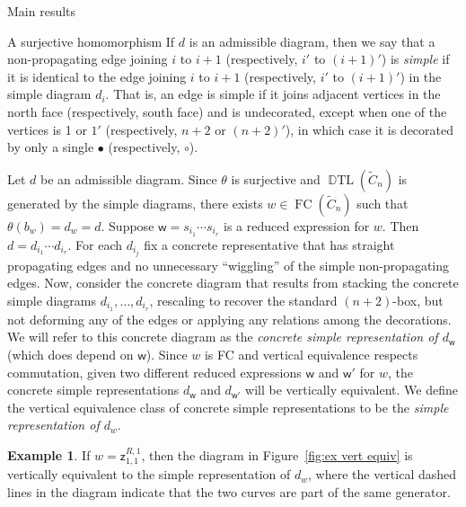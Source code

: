 \documentclass[11pt]{amsart}
\theoremstyle{definition}
\newtheorem{example}[theorem]{Example}
\numberwithin{equation}{section}
\newcommand{\C}{\widetilde{C}}
\newcommand{\z}{\mathsf{z}}
\newcommand{\x}{\mathsf{x}}
\DeclareMathOperator{\DTL}{\mathbb{D}TL}
\newcommand{\wcirc}{\circ}
\newcommand{\bcirc}{\bullet}
\renewcommand{\(}{\left(}
\renewcommand{\)}{\right)}
\newcommand{\w}{\mathsf{w}}
\DeclareMathOperator{\FC}{FC}
\begin{document}
\begin{section}{Main results}
\begin{subsection}{A surjective homomorphism}
If $d$ is an admissible diagram, then we say that a non-propagat\-ing edge joining $i$ to $i+1$ (respectively, $i'$ to $(i+1)'$) is \emph{simple} if it is identical to the edge joining $i$ to $i+1$ (respectively, $i'$ to $(i+1)'$) in the simple diagram $d_{i}$.  That is, an edge is simple if it joins adjacent vertices in the north face (respectively, south face) and is undecorated, except when one of the vertices is 1 or $1'$ (respectively, $n+2$ or $(n+2)'$), in which case it is decorated by only a single $\bcirc$ (respectively, $\wcirc$).  

Let $d$ be an admissible diagram.  Since $\theta$ is surjective and $\DTL(\C_n)$ is generated by the simple diagrams, there exists $w \in \FC(\C_{n})$ such that $\theta(b_{w})=d_{w}=d$.  Suppose $\w=s_{i_{1}}\cdots s_{i_{r}}$ is a reduced expression for $w$.  Then $d=d_{i_{1}}\cdots d_{i_{r}}$.   For each $d_{i_{j}}$ fix a concrete representative that has straight propagating edges and no unnecessary ``wiggling'' of the simple non-propagating edges.  Now, consider the concrete diagram that results from stacking the concrete simple diagrams $d_{i_{1}},\dots, d_{i_{r}}$, rescaling to recover the standard $(n+2)$-box, but not deforming any of the edges or applying any relations among the decorations.  We will refer to this concrete diagram as the \emph{concrete simple representation of $d_{\w}$} (which does depend on $\w$).  Since $w$ is FC and vertical equivalence respects commutation, given two different reduced expressions $\w$ and $\w'$ for $w$, the concrete simple representations $d_{\w}$ and $d_{\w'}$ will be vertically equivalent.  We define the vertical equivalence class of concrete simple representations to be the \emph{simple representation of $d_{w}$}.

\begin{example}\label{ex:vert equiv}
If $w=\z_{1,1}^{R,1}$, then the diagram in Figure~\ref{fig:ex vert equiv} is vertically equivalent to the simple representation of $d_{w}$, where the vertical dashed lines in the diagram indicate that the two curves are part of the same generator.
\end{example}

\begin{figure}[!ht]
\end{figure}
\end{subsection}
\end{section}
\end{document}
